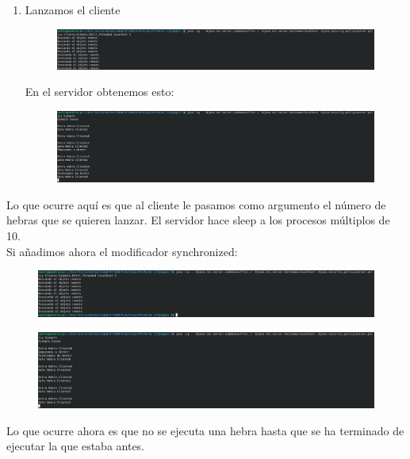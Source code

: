 \documentclass{article}
\begin{document}
\begin{enumerate}
\begin{figure}[H]
		\end{figure}
		\item Lanzamos el cliente
		\begin{figure}[H]
			\centering
			\includegraphics[totalheight=1.6cm]{img/15.png}
		\end{figure}
		En el servidor obtenemos esto:
		\begin{figure}[H]
			\centering
			\includegraphics[totalheight=2.8cm]{img/16.png}
		\end{figure}
		
	\end{enumerate}
	Lo que ocurre aquí es que al cliente le pasamos como argumento el número de hebras que se quieren lanzar. El servidor hace sleep a los procesos múltiplos de 10.\\
	
	Si añadimos ahora el modificador synchronized:
	\begin{figure}[H]
		\centering
		\includegraphics[totalheight=1.7cm]{img/17.png}
	\end{figure}
	\begin{figure}[H]
		\centering
		\includegraphics[totalheight=2.75cm]{img/18.png}
	\end{figure}
	Lo que ocurre ahora es que no se ejecuta una hebra hasta que se ha terminado de ejecutar la que estaba antes.
	
\end{document}
